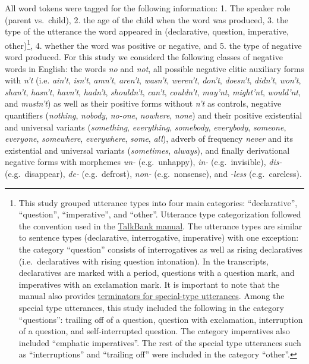 \documentclass[man,floatsintext,draftall]{apa6}
\let\rmarkdownfootnote\footnote%
\def\footnote{\protect\rmarkdownfootnote}
\begin{document}
All word tokens were tagged for the following information: 1. The speaker role (parent vs.~child), 2. the age of the child when the word was produced, 3. the type of the utterance the word appeared in (declarative, question, imperative, other)\footnote{This study grouped utterance types into four main categories: \enquote{declarative}, \enquote{question}, \enquote{imperative}, and \enquote{other}. Utterance type categorization followed the convention used in the \href{https://talkbank.org/manuals/CHAT.html\#_Toc486414422}{TalkBank manual}. The utterance types are similar to sentence types (declarative, interrogative, imperative) with one exception: the category \enquote{question} consists of interrogatives as well as rising declaratives (i.e.~declaratives with rising question intonation). In the transcripts, declaratives are marked with a period, questions with a question mark, and imperatives with an exclamation mark. It is important to note that the manual also provides \href{https://talkbank.org/manuals/CHAT.html\#_Toc486414431}{terminators for special-type utterances}. Among the special type utterances, this study included the following in the category \enquote{questions}: trailing off of a question, question with exclamation, interruption of a question, and self-interrupted question. The category imperatives also included \enquote{emphatic imperatives}. The rest of the special type utterances such as \enquote{interruptions} and \enquote{trailing off} were included in the category \enquote{other}.}, 4. whether the word was positive or negative, and 5. the type of negative word produced. For this study we considerd the following classes of negative words in English: the words \emph{no} and \emph{not}, all possible negative clitic auxiliary forms with \emph{n't} (i.e. \emph{ain't}, \emph{isn't}, \emph{amn't}, \emph{aren't}, \emph{wasn't}, \emph{weren't}, \emph{don't}, \emph{doesn't}, \emph{didn't}, \emph{won't}, \emph{shan't}, \emph{hasn't}, \emph{havn't}, \emph{hadn't}, \emph{shouldn't}, \emph{can't}, \emph{couldn't}, \emph{may'nt}, \emph{might'nt}, \emph{would'nt}, and \emph{mustn't}) as well as their positive forms without \emph{n't} as controls, negative quantifiers (\emph{nothing}, \emph{nobody}, \emph{no-one}, \emph{nowhere}, \emph{none}) and their positive existential and universal variants (\emph{something}, \emph{everything}, \emph{somebody}, \emph{everybody}, \emph{someone}, \emph{everyone}, \emph{somewhere}, \emph{everywhere}, \emph{some}, \emph{all}), adverb of frequency \emph{never} and its existential and universal variants (\emph{sometimes}, \emph{always}), and finally derivational negative forms with morphemes \emph{un-} (e.g.~unhappy), \emph{in-} (e.g.~invisible), \emph{dis-}(e.g.~disappear), \emph{de-} (e.g.~defrost), \emph{non-} (e.g.~nonsense), and \emph{-less} (e.g.~careless).
\end{document}

